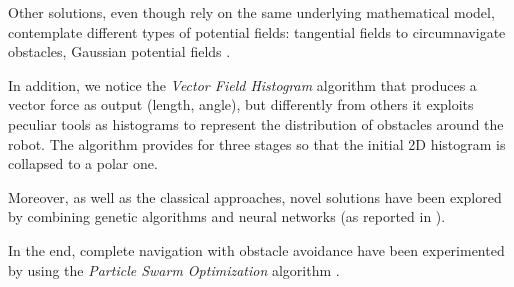 \noindent
Other solutions, even though rely on the same underlying mathematical model, contemplate different types of potential fields: tangential fields to circumnavigate obstacles, Gaussian potential fields \cite{obstacle-gaussian}.

\noindent
In addition, we notice the \textit{Vector Field Histogram} algorithm that produces a vector force as output (length, angle), but differently from others it exploits peculiar tools as histograms to represent the distribution of obstacles around the robot. The algorithm provides for three stages so that the initial 2D histogram is collapsed to a polar one.  

\noindent
Moreover, as well as the classical approaches, novel solutions have been explored by combining genetic algorithms and neural networks (as reported in \cite{obstacle-NN}).

\noindent
In the end, complete navigation with obstacle avoidance have been experimented by using the \textit{Particle Swarm Optimization} algorithm \cite{obstacle-summary-2}.





